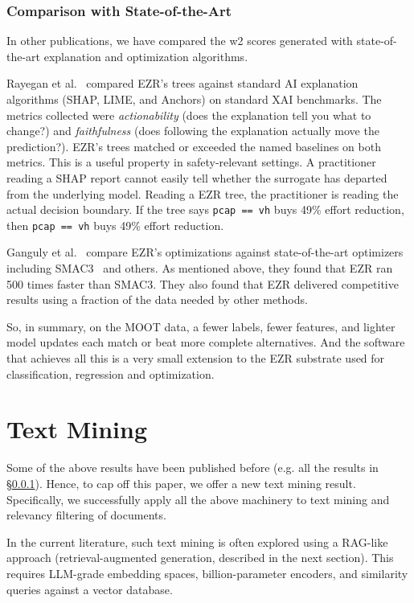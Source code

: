 \documentclass[AMA,STIX2COL]{WileyNJDv5}
\newcommand{\IT}{{\sffamily EZR}}
\begin{document}
\subsubsection{Comparison with State-of-the-Art}\label{sota}

In other publications, we have compared the \textsf{w2} scores generated
 with state-of-the-art explanation and optimization algorithms.


Rayegan et al.~\cite{Amiraliminimaldata} compared \IT{}'s trees against
standard AI explanation algorithms
(SHAP, LIME, and Anchors) on standard XAI benchmarks. The metrics collected
were {\em actionability} (does the explanation tell you what to
change?) and {\em faithfulness} (does following the explanation
actually move the prediction?). \IT{}'s trees matched or
exceeded the named baselines on both metrics.
This is a useful property in safety-relevant settings. A
practitioner reading a SHAP report cannot easily tell whether
the surrogate has departed from the underlying model. Reading a
\IT{} tree, the practitioner is reading the actual decision
boundary. If the tree says \texttt{pcap == vh} buys 49\% effort
reduction, then \texttt{pcap == vh} buys 49\% effort reduction.

Ganguly et al.~\cite{ganguly2026lowgodatalightse}    compare \IT{}'s
optimizations against state-of-the-art optimizers including SMAC3~\cite{hutter2011sequential}
and others.
As mentioned above, they found that  EZR ran 500 times faster than SMAC3. 
They also found that EZR delivered competitive results using a fraction
of the data needed by other methods.

So, in summary,
on the MOOT data, a  fewer labels,
fewer features, and lighter model updates each match or beat
more complete alternatives. And the software that achieves all
this is a very small extension to the EZR substrate used
for classification, regression and optimization.


\section{Text Mining}\label{sec:textmine}

Some of the above results have been published before (e.g. all the results
in \S\ref{sota}). 
Hence, to cap off this paper,
 we offer a new text mining result. Specifically, we successfully
 apply all the above machinery
 to text mining and relevancy filtering of documents.
 
 In the current literature,  such text mining is often
 explored using a RAG-like approach (retrieval-augmented
 generation, described in the next section). 
This requires LLM-grade embedding spaces, billion-parameter encoders,
and similarity queries against a vector database. 
\end{document}
